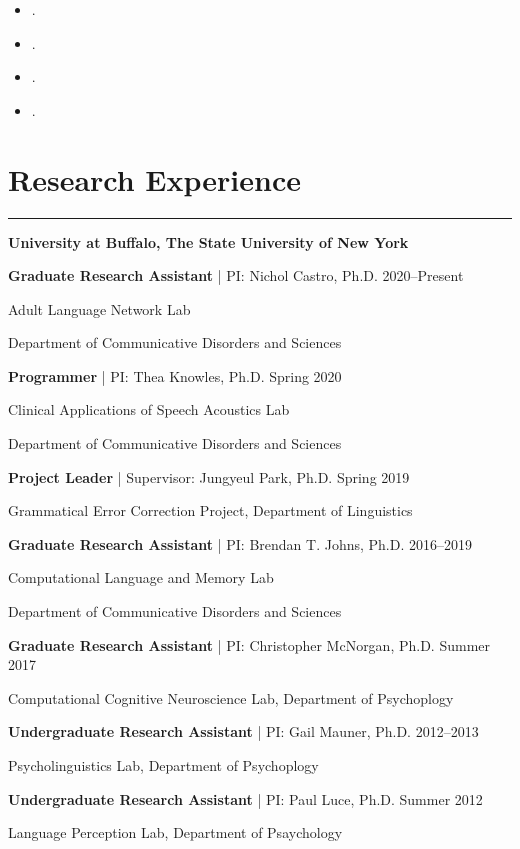 \documentclass[11pt]{article}
\newcommand{\cvsection}[1]{\vspace{-0.2cm}\section*{\Large #1}\vspace{-0.2cm}\hrule\vspace{0.2cm}}
\begin{document}
\begin{itemize}[leftmargin=!,labelindent=!,itemindent=-15pt]
    \setlength\itemsep{0.3em}

    \item[] .
    \item[] .
    \item[] .
    \item[] .

\end{itemize}


\cvsection{Research Experience}

\textbf{University at Buffalo, The State University of New York}

\textbf{Graduate Research Assistant} | PI: Nichol Castro, Ph.D. \hfill 2020--Present

\quad Adult Language Network Lab

\quad Department of Communicative Disorders and Sciences

\textbf{Programmer} | PI: Thea Knowles, Ph.D. \hfill Spring 2020

\quad Clinical Applications of Speech Acoustics Lab

\quad Department of Communicative Disorders and Sciences

\textbf{Project Leader} | Supervisor: Jungyeul Park, Ph.D. \hfill Spring 2019

\quad Grammatical Error Correction Project, Department of Linguistics

\textbf{Graduate Research Assistant} | PI: Brendan T. Johns, Ph.D. \hfill 2016--2019

\quad Computational Language and Memory Lab

\quad Department of Communicative Disorders and Sciences

\textbf{Graduate Research Assistant} | PI: Christopher McNorgan, Ph.D. \hfill Summer 2017

\quad Computational Cognitive Neuroscience Lab, Department of Psychoplogy

\textbf{Undergraduate Research Assistant} | PI: Gail Mauner, Ph.D. \hfill 2012--2013

\quad Psycholinguistics Lab, Department of Psychoplogy

\textbf{Undergraduate Research Assistant} | PI: Paul Luce, Ph.D. \hfill Summer 2012

\quad Language Perception Lab, Department of Psaychology
\end{document}
